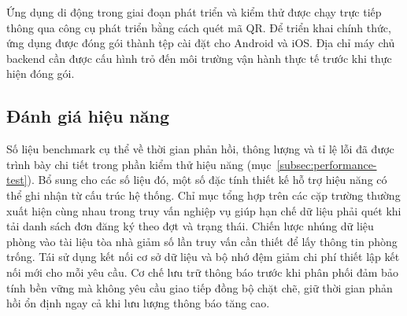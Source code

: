 \documentclass[../DoAn.tex]{subfiles}
\begin{document}
Ứng dụng di động trong giai đoạn phát triển và kiểm thử được chạy trực tiếp
thông qua công cụ phát triển bằng cách quét mã QR. Để triển khai chính thức,
ứng dụng được đóng gói thành tệp cài đặt cho Android và iOS. Địa chỉ máy chủ
backend cần được cấu hình trỏ đến môi trường vận hành thực tế trước khi thực
hiện đóng gói.

\subsection*{Đánh giá hiệu năng}

Số liệu benchmark cụ thể về thời gian phản hồi, thông lượng và tỉ lệ lỗi đã được
trình bày chi tiết trong phần kiểm thử hiệu năng (mục~\ref{subsec:performance-test}).
Bổ sung cho các số liệu đó, một số đặc tính thiết kế hỗ trợ hiệu năng có thể ghi
nhận từ cấu trúc hệ thống.
Chỉ mục tổng hợp trên các cặp trường thường xuất hiện cùng nhau trong truy vấn
nghiệp vụ giúp hạn chế dữ liệu phải quét khi tải danh sách đơn đăng ký theo
đợt và trạng thái. Chiến lược nhúng dữ liệu phòng vào tài liệu tòa nhà giảm
số lần truy vấn cần thiết để lấy thông tin phòng trống. Tái sử dụng kết nối
cơ sở dữ liệu và bộ nhớ đệm giảm chi phí thiết lập kết nối mới cho mỗi yêu
cầu. Cơ chế lưu trữ thông báo trước khi phân phối đảm bảo tính bền vững mà
không yêu cầu giao tiếp đồng bộ chặt chẽ, giữ thời gian phản hồi ổn định
ngay cả khi lưu lượng thông báo tăng cao.
\end{document}
